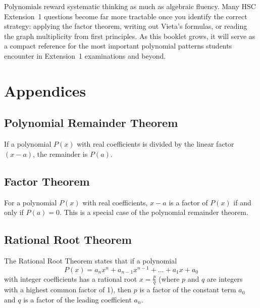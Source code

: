 \documentclass[12pt]{article}
\newenvironment{theorem}[1][]{%
  \begin{theorembox}[title={\bfseries Theorem~\thetcbcounter\ifx\relax#1\relax\else\ (#1)\fi}]%
}{%
  \end{theorembox}%
}
\begin{document}
Polynomials reward systematic thinking as much as algebraic fluency. Many HSC Extension~1 questions become far more tractable once you identify the correct strategy: applying the factor theorem, writing out Vieta's formulas, or reading the graph multiplicity from first principles. As this booklet grows, it will serve as a compact reference for the most important polynomial patterns students encounter in Extension~1 examinations and beyond.


\newpage
\appendix
\section{Appendices}

\subsection{Polynomial Remainder Theorem}

\begin{theorem}
If a polynomial $P(x)$ with real coefficients is divided by the linear factor $(x - a)$, the remainder is $P(a)$.
\end{theorem}

\subsection{Factor Theorem}

\begin{theorem}
For a polynomial $P(x)$ with real coefficients, $x - a$ is a factor of $P(x)$ if and only if $P(a) = 0$. This is a special case of the polynomial remainder theorem.
\end{theorem}

\subsection{Rational Root Theorem}

\begin{theorem}
The Rational Root Theorem states that if a polynomial 
\[ P(x) = a_n x^n + a_{n-1} x^{n-1} + \dots + a_1 x + a_0 \]
with integer coefficients has a rational root $x = \frac{p}{q}$ (where $p$ and $q$ are integers with a highest common factor of 1), then $p$ is a factor of the constant term $a_0$ and $q$ is a factor of the leading coefficient $a_n$. 
\end{theorem}
\end{document}
